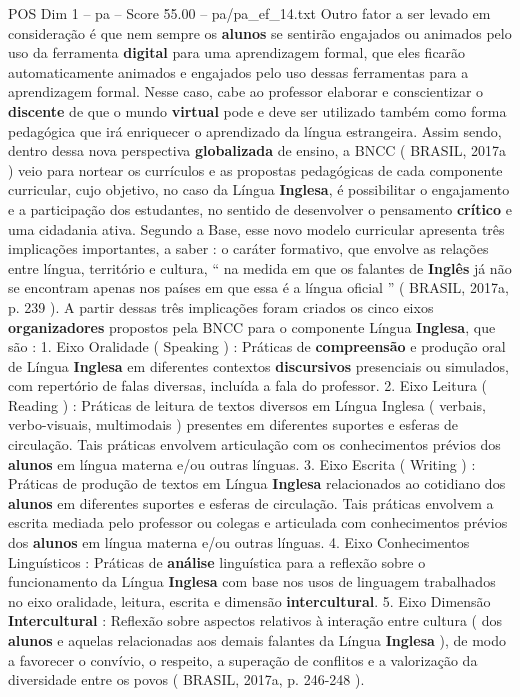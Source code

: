\begin{textsample}{POS Dim 1 – pa – Score 55.00 – pa/pa\_ef\_14.txt}
Outro fator a ser levado em consideração é que nem sempre os \textbf{alunos} se sentirão engajados ou animados pelo uso da ferramenta \textbf{digital} para uma aprendizagem formal, que eles ficarão automaticamente animados e engajados pelo uso dessas ferramentas para a aprendizagem formal.
Nesse caso, cabe ao professor elaborar e conscientizar o \textbf{discente} de que o mundo \textbf{virtual} pode e deve ser utilizado também como forma pedagógica que irá enriquecer o aprendizado da língua estrangeira.
Assim sendo, dentro dessa nova perspectiva \textbf{globalizada} de ensino, a BNCC ( BRASIL, 2017a ) veio para nortear os currículos e as propostas pedagógicas de cada componente curricular, cujo objetivo, no caso da Língua \textbf{Inglesa}, é possibilitar o engajamento e a participação dos estudantes, no sentido de desenvolver o pensamento \textbf{crítico} e uma cidadania ativa.
Segundo a Base, esse novo modelo curricular apresenta três implicações importantes, a saber : o caráter formativo, que envolve as relações entre língua, território e cultura, “ na medida em que os falantes de \textbf{Inglês} já não se encontram apenas nos países em que essa é a língua oficial ” ( BRASIL, 2017a, p. 239 ).
A partir dessas três implicações foram criados os cinco eixos \textbf{organizadores} propostos pela BNCC para o componente Língua \textbf{Inglesa}, que são : 1.
Eixo Oralidade ( Speaking ) : Práticas de \textbf{compreensão} e produção oral de Língua \textbf{Inglesa} em diferentes contextos \textbf{discursivos} presenciais ou simulados, com repertório de falas diversas, incluída a fala do professor. 2.
Eixo Leitura ( Reading ) : Práticas de leitura de textos diversos em Língua Inglesa ( verbais, verbo-visuais, multimodais ) presentes em diferentes suportes e esferas de circulação.
Tais práticas envolvem articulação com os conhecimentos prévios dos \textbf{alunos} em língua materna e/ou outras línguas. 3.
Eixo Escrita ( Writing ) : Práticas de produção de textos em Língua \textbf{Inglesa} relacionados ao cotidiano dos \textbf{alunos} em diferentes suportes e esferas de circulação.
Tais práticas envolvem a escrita mediada pelo professor ou colegas e articulada com conhecimentos prévios dos \textbf{alunos} em língua materna e/ou outras línguas. 4.
Eixo Conhecimentos Linguísticos : Práticas de \textbf{análise} linguística para a reflexão sobre o funcionamento da Língua \textbf{Inglesa} com base nos usos de linguagem trabalhados no eixo oralidade, leitura, escrita e dimensão \textbf{intercultural}. 5.
Eixo Dimensão \textbf{Intercultural} : Reflexão sobre aspectos relativos à interação entre cultura ( dos \textbf{alunos} e aquelas relacionadas aos demais falantes da Língua \textbf{Inglesa} ), de modo a favorecer o convívio, o respeito, a superação de conflitos e a valorização da diversidade entre os povos ( BRASIL, 2017a, p. 246-248 ).

\end{textsample}
